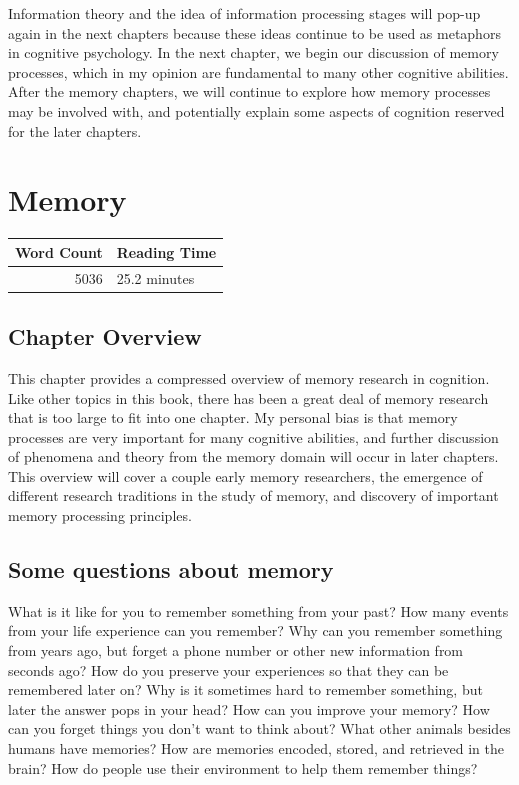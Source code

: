 \documentclass[
  oneside,
  12pt]{crumpbook}
\begin{document}
Information theory and the idea of information processing stages will pop-up again in the next chapters because these ideas continue to be used as metaphors in cognitive psychology. In the next chapter, we begin our discussion of memory processes, which in my opinion are fundamental to many other cognitive abilities. After the memory chapters, we will continue to explore how memory processes may be involved with, and potentially explain some aspects of cognition reserved for the later chapters.

\hypertarget{memory}{%
\chapter{Memory}\label{memory}}

\begin{tabular}{r|l}
\hline
Word Count & Reading Time\\
\hline
5036 & 25.2 minutes\\
\hline
\end{tabular}

\hypertarget{chapter-overview-5}{%
\section{Chapter Overview}\label{chapter-overview-5}}

This chapter provides a compressed overview of memory research in cognition. Like other topics in this book, there has been a great deal of memory research that is too large to fit into one chapter. My personal bias is that memory processes are very important for many cognitive abilities, and further discussion of phenomena and theory from the memory domain will occur in later chapters. This overview will cover a couple early memory researchers, the emergence of different research traditions in the study of memory, and discovery of important memory processing principles.

\hypertarget{some-questions-about-memory}{%
\section{Some questions about memory}\label{some-questions-about-memory}}

What is it like for you to remember something from your past? How many events from your life experience can you remember? Why can you remember something from years ago, but forget a phone number or other new information from seconds ago? How do you preserve your experiences so that they can be remembered later on? Why is it sometimes hard to remember something, but later the answer pops in your head? How can you improve your memory? How can you forget things you don't want to think about? What other animals besides humans have memories? How are memories encoded, stored, and retrieved in the brain? How do people use their environment to help them remember things?
\end{document}
